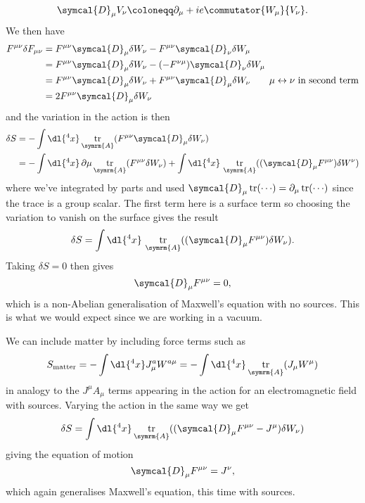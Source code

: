 \documentclass[fleqn]{NotesClass}
\DeclareMathOperator{\tr}{tr}
\newcommand{\covariantDerivative}{\symcal{D}}
\begin{document}
    \begin{equation}
        \covariantDerivative_\mu V_\nu \coloneqq \partial_\mu + ie\commutator{W_\mu}{V_\nu}.
    \end{equation}
    We then have
    \begin{align}
        F^{\mu\nu}\delta F_{\mu\nu} &= F^{\mu\nu}\covariantDerivative_\mu \delta W_\nu - F^{\mu\nu}\covariantDerivative_\nu \delta W_\mu\\
        &= F^{\mu\nu} \covariantDerivative_\mu \delta W_\nu - (-F^{\nu\mu})\covariantDerivative_\nu \delta W_\mu\\
        &= F^{\mu\nu} \covariantDerivative_\mu \delta W_\nu + F^{\mu\nu}\covariantDerivative_\mu \delta W_\nu \qquad \mu \leftrightarrow \nu \text{ in second term}\\
        &= 2F^{\mu\nu} \covariantDerivative_\mu \delta W_\nu
    \end{align}
    and the variation in the action is then
    \begin{align}
        \delta S &= -\int \dl{^4x} \tr_{\symrm{A}}(F^{\mu\nu} \covariantDerivative_\mu \delta W_\nu)\\
        &= -\int \dl{^4x} \, \partial\mu \tr_{\symrm{A}}(F^{\mu\nu} \delta W_\nu) + \int \dl{^4x} \, \tr_{\symrm{A}}((\covariantDerivative_\mu F^{\mu\nu}) \delta W^\nu)
    \end{align}
    where we've integrated by parts and used \(\covariantDerivative_\mu \tr({\dotsm}) = \partial_\mu \tr({\dotsm})\) since the trace is a group scalar.
    The first term here is a surface term so choosing the variation to vanish on the surface gives the result
    \begin{equation}
        \delta S = \int \dl{^4x} \, \tr_{\symrm{A}}((\covariantDerivative_\mu F^{\mu\nu}) \delta W_\nu).
    \end{equation}
    Taking \(\delta S = 0\) then gives
    \begin{equation}
        \covariantDerivative_\mu F^{\mu\nu} = 0,
    \end{equation}
    which is a non-Abelian generalisation of Maxwell's equation with no sources.
    This is what we would expect since we are working in a vacuum.
    
    We can include matter by including force terms such as
    \begin{equation}
        S_{\text{matter}} = -\int \dl{^4x} J_\mu^a W^{a\mu} = -\int \dl{^4x} \tr_{\symrm{A}}(J_\mu W^\mu)
    \end{equation}
    in analogy to the \(J^\mu A_\mu\) terms appearing in the action for an electromagnetic field with sources.
    Varying the action in the same way we get
    \begin{equation}
        \delta S = \int \dl{^4x} \tr_{\symrm{A}}((\covariantDerivative_\mu F^{\mu\nu} - J^\mu) \delta W_\nu )
    \end{equation}
    giving the equation of motion
    \begin{equation}
        \covariantDerivative_\mu F^{\mu\nu} = J^\nu,
    \end{equation}
    which again generalises Maxwell's equation, this time with sources.
    
\end{document}
